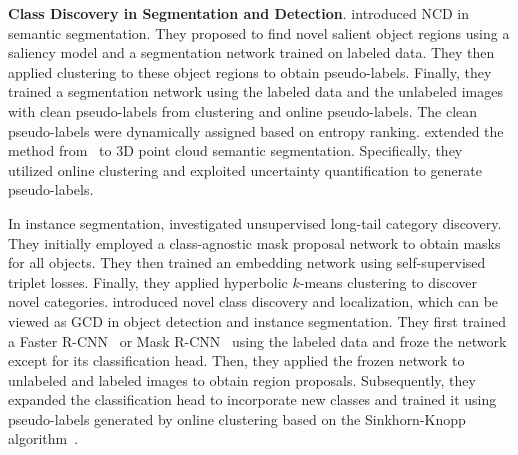 \noindent \textbf{Class Discovery in Segmentation and Detection}. 
\cite{zhao2022novel} introduced NCD in semantic segmentation. They proposed to find novel salient object regions using a saliency model and a segmentation network trained on labeled data. They then applied clustering to these object regions to obtain pseudo-labels. Finally, they trained a segmentation network using the labeled data and the unlabeled images with clean pseudo-labels from clustering and online pseudo-labels. The clean pseudo-labels were dynamically assigned based on entropy ranking. \cite{riz2023novel} extended the method from~\cite{zhao2022novel} to 3D point cloud semantic segmentation. Specifically, they utilized online clustering and exploited uncertainty quantification to generate pseudo-labels.


In instance segmentation, \cite{weng2021unsupervised} investigated unsupervised long-tail category discovery. They initially employed a class-agnostic mask proposal network to obtain masks for all objects. They then trained an embedding network using self-supervised triplet losses. Finally, they applied hyperbolic $k$-means clustering to discover novel categories. \cite{fomenko2022learning} introduced novel class discovery and localization, which can be viewed as GCD in object detection and instance segmentation. They first trained a Faster R-CNN~\cite{ren2015faster} or Mask R-CNN~\cite{he2017mask} using the labeled data and froze the network except for its classification head. Then, they applied the frozen network to unlabeled and labeled images to obtain region proposals. Subsequently, they expanded the classification head to incorporate new classes and trained it using pseudo-labels generated by online clustering based on the Sinkhorn-Knopp algorithm~\cite{Cuturi2013Sinkhorn}.








